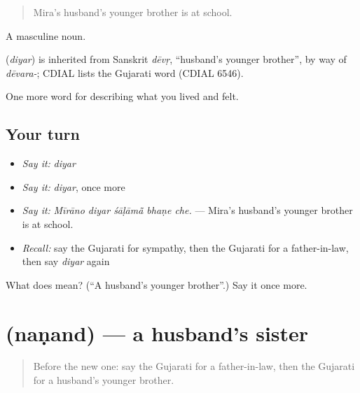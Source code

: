 \begin{quote}
Mira's husband's younger brother is at school.
\end{quote}

A masculine noun.

\begin{cousinweb}
\textbf{} (\emph{diyar}) is inherited from Sanskrit \emph{dēvṛ}, \textquotedblleft{}husband's younger brother\textquotedblright{}, by way of \emph{dēvara-}; CDIAL lists the Gujarati word (CDIAL 6546).
\end{cousinweb}

\begin{grammarlens}[title={What you've built}]
One more word for describing what you lived and felt.
\end{grammarlens}

\subsection*{Your turn}
\begin{itemize}
\raggedright
  \item \emph{Say it:} \emph{diyar}
  \item \emph{Say it:} \emph{diyar}, once more
  \item \emph{Say it:} \emph{Mīrāno diyar śāḷāmā̃ bhaṇe che.} — Mira's husband's younger brother is at school.
  \item \emph{Recall:} say the Gujarati for sympathy, then the Gujarati for a father-in-law, then say \emph{diyar} again
\end{itemize}

\begin{tcolorbox}[breakable,colback=teal!4,colframe=teal!35!black,title={Before you move on}]
What does  mean? (\textquotedblleft{}A husband's younger brother\textquotedblright{}.) Say it once more.
\end{tcolorbox}
\section[\texorpdfstring{\gu{નણંદ} (naṇand)}{નણંદ (naṇand)}]{ (naṇand) — a husband's sister}

\label{lesson:GU-C490-nanand}



\begin{quote}
Before the new one: say the Gujarati for a father-in-law, then the Gujarati for a husband's younger brother.
\end{quote}

